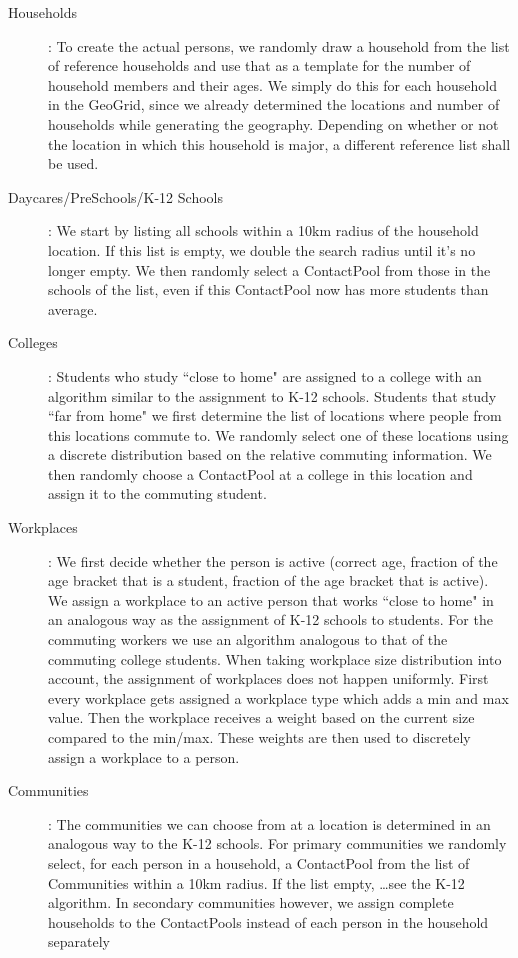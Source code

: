 \begin{description}
    \item[Households]:
        To create the actual persons, we randomly draw a household from the list of reference households 
        and use that as a template for the number of household members and their ages.
        We simply do this for each household in the GeoGrid, since we already determined 
        the locations and number of households while generating the geography. Depending on whether or not the location in which this household is major, a different reference list shall be used.
        
    \item[Daycares/PreSchools/K-12 Schools]:
        We start by listing all schools within a 10km radius of the household location. 
        If this list is empty, we double the search radius until it's no longer empty.
        We then randomly select a ContactPool from those in the schools of the list,
       even if this ContactPool now has more students than average.
    \item[Colleges]:
        Students who study ``close to home" are assigned to a college with an algorithm
        similar to the assignment to K-12 schools.
        Students that study ``far from home" we first determine the list of locations 
        where people from this locations commute to. We randomly select one of these locations 
        using a discrete distribution based on the relative commuting information.
        We then randomly choose a ContactPool at a college in this location and assign it to 
        the commuting student.
    \item[Workplaces]:
        We first decide whether the person is active (correct age, fraction of the age bracket that is a student,
        fraction of the age bracket that is active).
        We assign a workplace to an active person that works ``close to home" in an 
        analogous way as the assignment of K-12 schools to students.
        For the commuting workers we use an algorithm analogous to that of the commuting college students. When taking workplace size distribution into account, the assignment of workplaces does not happen uniformly. First every workplace gets assigned a workplace type which adds a min and max value. Then the workplace receives a weight based on the current size compared to the min/max. These weights are then used to discretely assign a workplace to a person.
    \item[Communities]:
        The communities we can choose from at a location is determined in an analogous 
        way to the K-12 schools.
        For primary communities we randomly select, for each person in a household, a ContactPool 
        from the list of Communities within a 10km radius. If the list empty, \ldots see the K-12 algorithm.
        In secondary communities however, we assign complete households to the 
        ContactPools instead of each person in the household separately
\end{description}

